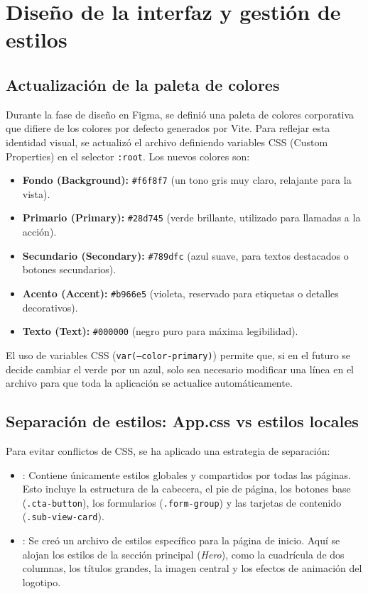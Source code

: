 \documentclass[12pt,a4paper]{report}
\begin{document}
\section{Diseño de la interfaz y gestión de estilos}

\subsection{Actualización de la paleta de colores}

Durante la fase de diseño en Figma, se definió una paleta de colores corporativa que difiere de los colores por defecto generados por Vite. Para reflejar esta identidad visual, se actualizó el archivo  definiendo variables CSS (Custom Properties) en el selector \texttt{:root}. Los nuevos colores son:

\begin{itemize}
    \item \textbf{Fondo (Background):} \texttt{\#f6f8f7} (un tono gris muy claro, relajante para la vista).
    \item \textbf{Primario (Primary):} \texttt{\#28d745} (verde brillante, utilizado para llamadas a la acción).
    \item \textbf{Secundario (Secondary):} \texttt{\#789dfc} (azul suave, para textos destacados o botones secundarios).
    \item \textbf{Acento (Accent):} \texttt{\#b966e5} (violeta, reservado para etiquetas o detalles decorativos).
    \item \textbf{Texto (Text):} \texttt{\#000000} (negro puro para máxima legibilidad).
\end{itemize}

El uso de variables CSS (\texttt{var(--color-primary)}) permite que, si en el futuro se decide cambiar el verde por un azul, solo sea necesario modificar una línea en el archivo  para que toda la aplicación se actualice automáticamente.

\subsection{Separación de estilos: App.css vs estilos locales}

Para evitar conflictos de CSS, se ha aplicado una estrategia de separación:

\begin{itemize}
    \item {}: Contiene únicamente estilos globales y compartidos por todas las páginas. Esto incluye la estructura de la cabecera, el pie de página, los botones base (\texttt{.cta-button}), los formularios (\texttt{.form-group}) y las tarjetas de contenido (\texttt{.sub-view-card}).
    \item {}: Se creó un archivo de estilos específico para la página de inicio. Aquí se alojan los estilos de la sección principal (\textit{Hero}), como la cuadrícula de dos columnas, los títulos grandes, la imagen central y los efectos de animación del logotipo.
\end{itemize}
\end{document}
